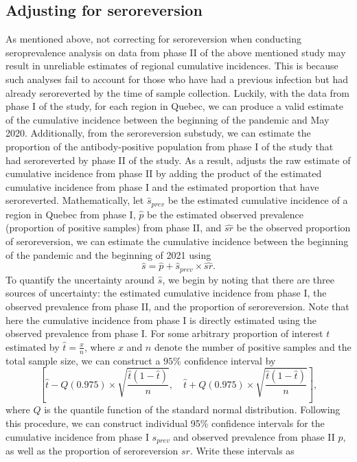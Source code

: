 \subsection{Adjusting for seroreversion}\label{sec:adjust_reversion}
As mentioned above, not correcting for seroreversion when conducting seroprevalence analysis on data from phase II of the above mentioned study may result in unreliable estimates of regional cumulative incidences. This is because such analyses fail to account for those who have had a previous infection but had already seroreverted by the time of sample collection. Luckily, with the data from phase I of the study, for each region in Quebec, we can produce a valid estimate of the cumulative incidence between the beginning of the pandemic and May 2020. Additionally, from the seroreversion substudy, we can estimate the proportion of the antibody-positive population from phase I of the study that had seroreverted by phase II of the study. As a result, \cite{lewin2022seroprevalence} adjusts the raw estimate of cumulative incidence from phase II by adding the product of the estimated cumulative incidence from phase I and the estimated proportion that have seroreverted. Mathematically, let $\hat{s}_{prev}$ be the estimated cumulative incidence of a region in Quebec from phase I, $\hat{p}$ be the estimated observed prevalence (proportion of positive samples) from phase II, and $\hat{sr}$ be the observed proportion of seroreversion, we can estimate the cumulative incidence between the beginning of the pandemic and the beginning of 2021 using
\[
\hat{s} = \hat{p} + \hat{s}_{prev} \times \hat{sr}.
\]
To quantify the uncertainty around $\hat{s}$, we begin by noting that there are three sources of uncertainty: the estimated cumulative incidence from phase I, the observed prevalence from phase II, and the proportion of seroreversion. Note that here the cumulative incidence from phase I is directly estimated using the observed prevalence from phase I. For some arbitrary proportion of interest $t$ estimated by $\hat{t} = \frac{x}{n}$, where $x$ and $n$ denote the number of positive samples and the total sample size, we can construct a $95$\% confidence interval by
\[
\left[ \hat{t} - Q(0.975) \times \sqrt{\frac{\hat{t}(1-\hat{t})}{n}}, \quad \hat{t} + Q(0.975) \times \sqrt{\frac{\hat{t}(1-\hat{t})}{n}} \right],
\]
where $Q$ is the quantile function of the standard normal distribution. Following this procedure, we can construct individual 95\% confidence intervals for the cumulative incidence from phase I $s_{prev}$ and observed prevalence from phase II $p$, as well as the proportion of seroreversion $sr$. Write these intervals as
